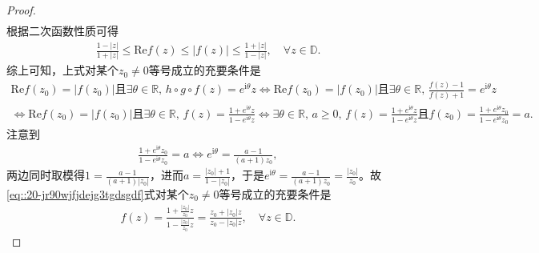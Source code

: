 \documentclass[../../main.tex]{subfiles}%
\begin{document}
\begin{proof}
\begin{align*}
\end{align*}
根据二次函数性质可得
\begin{align}\label{eq::20-jr90wjfjdejg3tgdsgdf}
\frac{1-\left| z \right|}{1+\left| z \right|}\leqslant \mathrm{Re}f(z) \leqslant \left| f(z) \right|\leqslant \frac{1+\left| z \right|}{1-\left| z \right|},\quad \forall z\in\mathbb{D}.
\end{align}
综上可知，上式对某个$z_0\neq 0$等号成立的充要条件是
\begin{align*}
\mathrm{Re}f(z_0)=\left| f(z_0) \right|\text{且}\exists \theta \in \mathbb{R},\,h\circ g\circ f(z)=e^{\mathrm{i}\theta}z\Longleftrightarrow \mathrm{Re}f(z_0)=\left| f(z_0) \right|\text{且}\exists \theta \in \mathbb{R},\,\frac{f(z)-1}{f(z)+1}=e^{\mathrm{i}\theta}z \\
\Longleftrightarrow \mathrm{Re}f(z_0)=\left| f(z_0) \right|\text{且}\exists \theta \in \mathbb{R},\,f(z)=\frac{1+e^{\mathrm{i}\theta}z}{1-e^{\mathrm{i}\theta}z}\Longleftrightarrow \exists \theta \in \mathbb{R},\,a\geqslant 0,\,f(z)=\frac{1+e^{\mathrm{i}\theta}z}{1-e^{\mathrm{i}\theta}z}\text{且}f(z_0)=\frac{1+e^{\mathrm{i}\theta}z_0}{1-e^{\mathrm{i}\theta}z_0}=a.
\end{align*}
注意到
\begin{align*}
\frac{1+e^{\mathrm{i}\theta}z_0}{1-e^{\mathrm{i}\theta}z_0}=a\Longleftrightarrow e^{\mathrm{i}\theta}=\frac{a-1}{(a+1)z_0},
\end{align*}
两边同时取模得$1=\frac{a-1}{(a+1)\left| z_0 \right|}$，进而$a=\frac{\left| z_0 \right|+1}{1-\left| z_0 \right|}$，于是$e^{\mathrm{i}\theta}=\frac{a-1}{(a+1)z_0}=\frac{\left| z_0 \right|}{z_0}$。故\eqref{eq::20-jr90wjfjdejg3tgdsgdf}式对某个$z_0\neq 0$等号成立的充要条件是
\begin{align*}
f(z)=\frac{1+\frac{\left| z_0 \right|}{z_0}z}{1-\frac{\left| z_0 \right|}{z_0}z}=\frac{z_0+\left| z_0 \right|z}{z_0-\left| z_0 \right|z},\quad \forall z\in\mathbb{D}.
\end{align*}

\end{proof}
\end{document}

